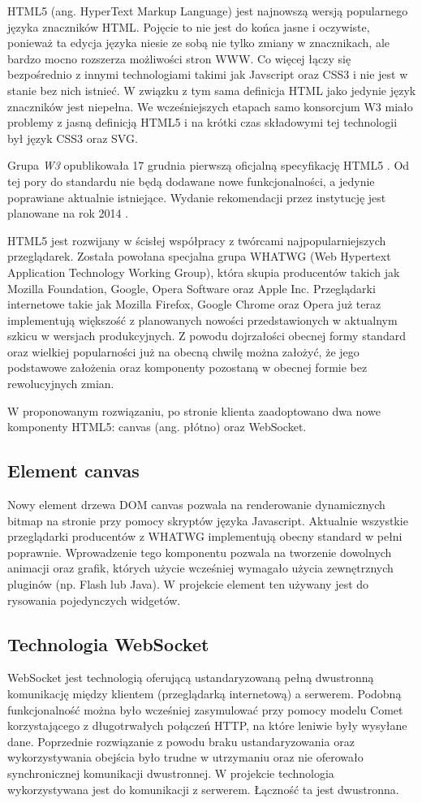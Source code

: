 HTML5 (ang. HyperText Markup Language) jest najnowszą wersją popularnego języka znaczników HTML. Pojęcie to nie jest do końca jasne i oczywiste, ponieważ ta edycja języka niesie ze sobą nie tylko zmiany w znacznikach, ale bardzo mocno rozszerza możliwości stron WWW. Co więcej łączy się bezpośrednio z innymi technologiami takimi jak Javscript oraz CSS3 i nie jest w stanie bez nich istnieć. W związku z tym sama definicja HTML jako jedynie język znaczników jest niepełna. We wcześniejszych etapach samo konsorcjum W3 miało problemy z jasną definicją HTML5 i na krótki czas składowymi tej technologii był język CSS3 oraz SVG. \cite{html5games}

Grupa \emph{W3} opublikowała 17 grudnia pierwszą oficjalną specyfikację HTML5 \cite{html5w3}. Od tej pory do standardu nie będą dodawane nowe funkcjonalności, a jedynie poprawiane aktualnie istniejące. Wydanie rekomendacji przez instytucję jest planowane na rok 2014 \cite{plan2014}.

HTML5 jest rozwijany w ścisłej współpracy z twórcami najpopularniejszych przeglądarek. Została powołana specjalna grupa WHATWG (Web Hypertext Application Technology Working Group), która skupia producentów takich jak Mozilla Foundation, Google, Opera Software oraz Apple Inc. Przeglądarki internetowe takie jak Mozilla Firefox, Google Chrome oraz Opera już teraz implementują większość z planowanych nowości przedstawionych w aktualnym szkicu w wersjach produkcyjnych. Z powodu dojrzałości obecnej formy standard oraz wielkiej popularności już na obecną chwilę można założyć, że jego podstawowe założenia oraz komponenty pozostaną w obecnej formie bez rewolucyjnych zmian.

W proponowanym rozwiązaniu, po stronie klienta zaadoptowano dwa nowe komponenty HTML5: canvas (ang. płótno) oraz WebSocket.

\subsection{Element canvas}
Nowy element drzewa DOM canvas pozwala na renderowanie dynamicznych bitmap na stronie przy pomocy skryptów języka Javascript. Aktualnie wszystkie przeglądarki producentów z WHATWG implementują obecny standard w pełni poprawnie.
 Wprowadzenie tego komponentu pozwala na tworzenie dowolnych animacji oraz grafik, których użycie wcześniej wymagało użycia zewnętrznych pluginów (np. Flash lub Java).
W projekcie element ten używany jest do rysowania pojedynczych widgetów. 

\subsection{Technologia WebSocket}
WebSocket jest technologią oferującą ustandaryzowaną pełną dwustronną komunikację między klientem (przeglądarką internetową) a serwerem. Podobną funkcjonalność można było wcześniej zasymulować przy pomocy modelu Comet korzystającego z długotrwałych połączeń HTTP, na które leniwie były wysyłane dane. Poprzednie rozwiązanie z powodu braku ustandaryzowania oraz wykorzystywania obejścia było trudne w utrzymaniu oraz nie oferowało synchronicznej komunikacji dwustronnej.
W projekcie technologia wykorzystywana jest do komunikacji z serwerem. Łączność ta jest dwustronna.
